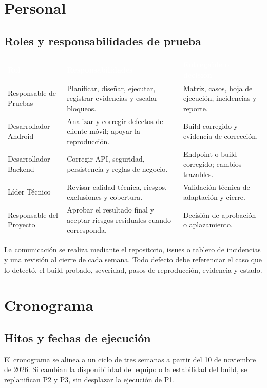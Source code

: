 \documentclass[11pt,a4paper]{article}
\newcommand{\thead}[1]{\textcolor{white}{\textbf{#1}}}
\begin{document}
\section{Personal}
\subsection{Roles y responsabilidades de prueba}
\begin{tabularx}{\textwidth}{p{2.4cm}p{7.5cm}p{5.3cm}}
\rowcolor{uniwayblue}\thead{Rol} & \thead{Responsabilidades} & \thead{Entregable o decisión}\\
\midrule
Responsable de Pruebas & Planificar, diseñar, ejecutar, registrar evidencias y escalar bloqueos. & Matriz, casos, hoja de ejecución, incidencias y reporte.\\
\rowcolor{lightgray}Desarrollador Android & Analizar y corregir defectos de cliente móvil; apoyar la reproducción. & Build corregido y evidencia de corrección.\\
Desarrollador Backend & Corregir API, seguridad, persistencia y reglas de negocio. & Endpoint o build corregido; cambios trazables.\\
\rowcolor{lightgray}Líder Técnico & Revisar calidad técnica, riesgos, exclusiones y cobertura. & Validación técnica de adaptación y cierre.\\
Responsable del Proyecto & Aprobar el resultado final y aceptar riesgos residuales cuando corresponda. & Decisión de aprobación o aplazamiento.\\
\end{tabularx}

\medskip
La comunicación se realiza mediante el repositorio, issues o tablero de incidencias y una revisión al cierre de cada semana. Todo defecto debe referenciar el caso que lo detectó, el build probado, severidad, pasos de reproducción, evidencia y estado.

\section{Cronograma}
\subsection{Hitos y fechas de ejecución}
El cronograma se alinea a un ciclo de tres semanas a partir del 10 de noviembre de 2026. Si cambian la disponibilidad del equipo o la estabilidad del build, se replanifican P2 y P3, sin desplazar la ejecución de P1.
\end{document}
